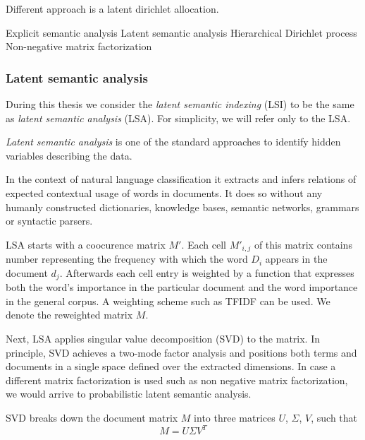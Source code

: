     Different approach is a latent dirichlet allocation.
    
    Explicit semantic analysis
    Latent semantic analysis
    Hierarchical Dirichlet process
    Non-negative matrix factorization
    
    
    \subsubsection{Latent semantic analysis}
    
    During this thesis we consider the \emph{latent semantic indexing} (LSI) to be the same as \emph{latent semantic analysis} (LSA).
    For simplicity, we will refer only to the LSA.
    
    \emph{Latent semantic analysis} is one of the standard approaches to identify hidden variables describing the data.
    
    In the context of natural language classification it extracts and infers relations of expected contextual usage of words in documents.
    It does so without any humanly constructed dictionaries, knowledge bases, semantic networks, grammars or syntactic parsers.
    
    LSA starts with a coocurence matrix $M'$. 
    Each cell $M'_{i,j}$ of this matrix contains number representing the frequency with  which  the  word $D_i$ appears in the document $d_j$.
    Afterwards each cell entry is weighted by a function that expresses both the word's importance in the particular document and the word importance in the general corpus.
    A weighting scheme such as TFIDF can be used.
    We denote the reweighted matrix $M$. 
    
    Next, LSA applies singular value decomposition (SVD) to the matrix.
    In principle, SVD achieves a two-mode factor analysis and positions both terms and documents in a single space defined over the extracted dimensions.
    In case a different matrix factorization is used such as non negative matrix factorization, we would arrive to probabilistic latent semantic analysis.
    
    SVD breaks down the document matrix $M$ into three matrices $U$, $\Sigma$, $V$,\cite{papadimitriou2000latent} %
    \cite{deerwester1990indexing} %
    \cite{maas2011learning} %
    \cite{wiemer2004latent} %
    \cite{landauer1998introduction} %
    such that $$M=U \Sigma V^T$$ 

